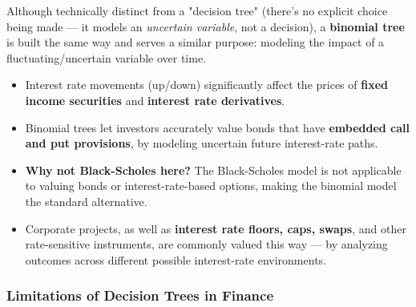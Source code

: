 \documentclass[12pt,openany]{book}
\begin{document}
Although technically distinct from a "decision tree" (there's no explicit choice being made --- it models an \textit{uncertain variable}, not a decision), a \textbf{binomial tree} is built the same way and serves a similar purpose: modeling the impact of a fluctuating/uncertain variable over time.

\begin{itemize}[leftmargin=*]
    \item Interest rate movements (up/down) significantly affect the prices of \textbf{fixed income securities} and \textbf{interest rate derivatives}.
    \item Binomial trees let investors accurately value bonds that have \textbf{embedded call and put provisions}, by modeling uncertain future interest-rate paths.
    \item \textbf{Why not Black-Scholes here?} The Black-Scholes model is not applicable to valuing bonds or interest-rate-based options, making the binomial model the standard alternative.
    \item Corporate projects, as well as \textbf{interest rate floors, caps, swaps}, and other rate-sensitive instruments, are commonly valued this way --- by analyzing outcomes across different possible interest-rate environments.
\end{itemize}


\subsubsection{Limitations of Decision Trees in Finance}
\end{document}
